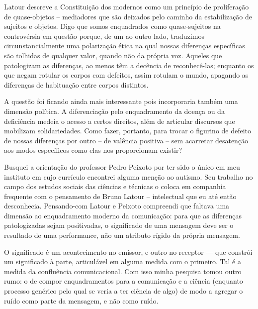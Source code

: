 Latour descreve a Constituição dos modernos como um princípio de proliferação de quase-objetos -- mediadores que são deixados pelo caminho da estabilização de sujeitos e objetos. Digo que somos enquadrados como quase-sujeitos na controvérsia em questão porque, de um ao outro lado, traduzimos circunstancialmente uma polarização ética na qual nossas diferenças específicas são tolhidas de qualquer valor, quando não da própria voz. Aqueles que patologizam as diferenças, ao menos têm a decência de reconhecê-las; enquanto os que negam rotular os corpos com defeitos, assim rotulam o mundo, apagando as diferenças de habituação entre corpos distintos.

A questão foi ficando ainda mais interessante pois incorporaria também uma dimensão política. A diferenciação pelo enquadramento da doença ou da deficiência medeia o acesso a certos direitos, além de articular discursos que mobilizam solidariedades. Como fazer, portanto, para trocar o figurino de defeito de nossas diferenças por outro -- de valência positiva -- sem acarretar desatenção aos modos específicos como elas nos proporcionam existir?

Busquei a orientação do professor Pedro Peixoto por ter sido o único em meu instituto em cujo currículo encontrei alguma menção ao autismo. Seu trabalho no campo dos estudos sociais das ciências e técnicas o coloca em companhia frequente com o pensamento de Bruno Latour -- intelectual que eu até então desconhecia. Pensando-com Latour e Peixoto compreendi que faltava uma dimensão ao enquadramento moderno da comunicação: para que as diferenças patologizadas sejam positivadas, o significado de uma mensagem deve ser o resultado de uma performance, não um atributo rígido da própria mensagem.

O significado é um acontecimento no emissor, e outro no receptor --- que constrói um significado à parte, articulável em alguma medida com o primeiro. Tal é a medida da confluência comunicacional. Com isso minha pesquisa tomou outro rumo: o de compor enquadramentos para a comunicação e a ciência (enquanto processo genérico pelo qual se veria a ter ciência de algo) de modo a agregar o ruído como parte da mensagem, e não como ruído.

